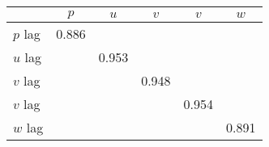 \begin{tabular}{l*{5}{c}}
\toprule
                &\multicolumn{1}{c}{$ p $}&\multicolumn{1}{c}{$ u $}&\multicolumn{1}{c}{$ v $}&\multicolumn{1}{c}{$ v $}&\multicolumn{1}{c}{$ w $}\\
\midrule
$ p $ lag       &    0.886&         &         &         &         \\
$ u $ lag       &         &    0.953&         &         &         \\
$ v $ lag       &         &         &    0.948&         &         \\
$ v $ lag       &         &         &         &    0.954&         \\
$ w $ lag       &         &         &         &         &    0.891\\
\bottomrule
\end{tabular}
